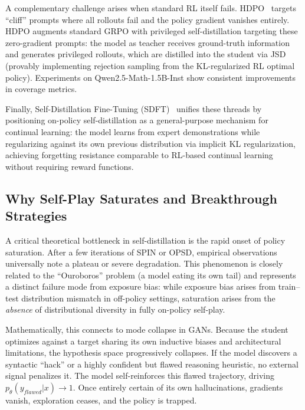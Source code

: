 \documentclass{article} %
\newcommand{\ptheta}{p_\theta}
\begin{document}
A complementary challenge arises when standard RL itself fails. HDPO~\citep{2603.23871} targets ``cliff'' prompts where all rollouts fail and the policy gradient vanishes entirely. HDPO augments standard GRPO with privileged self-distillation targeting these zero-gradient prompts: the model as teacher receives ground-truth information and generates privileged rollouts, which are distilled into the student via JSD (provably implementing rejection sampling from the KL-regularized RL optimal policy). Experiments on Qwen2.5-Math-1.5B-Inst show consistent improvements in coverage metrics.

Finally, Self-Distillation Fine-Tuning (SDFT)~\citep{2601.19897} unifies these threads by positioning on-policy self-distillation as a general-purpose mechanism for continual learning: the model learns from expert demonstrations while regularizing against its own previous distribution via implicit KL regularization, achieving forgetting resistance comparable to RL-based continual learning without requiring reward functions.


\subsection{Why Self-Play Saturates and Breakthrough Strategies}
\label{subsec:saturation_analysis}

A critical theoretical bottleneck in self-distillation is the rapid onset of policy saturation. After a few iterations of SPIN or OPSD, empirical observations universally note a plateau or severe degradation. This phenomenon is closely related to the ``Ouroboros'' problem (a model eating its own tail) and represents a distinct failure mode from exposure bias: while exposure bias arises from train--test distribution mismatch in off-policy settings, saturation arises from the \emph{absence} of distributional diversity in fully on-policy self-play.

Mathematically, this connects to mode collapse in GANs. Because the student optimizes against a target sharing its own inductive biases and architectural limitations, the hypothesis space progressively collapses. If the model discovers a syntactic ``hack'' or a highly confident but flawed reasoning heuristic, no external signal penalizes it. The model self-reinforces this flawed trajectory, driving $\ptheta(y_{flawed}|x) \to 1$. Once entirely certain of its own hallucinations, gradients vanish, exploration ceases, and the policy is trapped.
\end{document}
